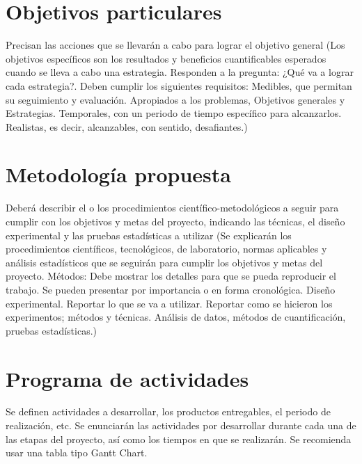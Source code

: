 \documentclass[letterpaper,12pt,oneside]{article}
\begin{document}
\section{Objetivos particulares}
Precisan las acciones que se llevarán a cabo para lograr el objetivo general (Los objetivos específicos son los resultados y beneficios cuantificables esperados cuando se lleva a cabo una estrategia. Responden a la pregunta: ¿Qué va a lograr cada estrategia?. Deben cumplir los siguientes requisitos: Medibles, que permitan su seguimiento y evaluación. Apropiados a los problemas, Objetivos generales y Estrategias. Temporales, con un periodo de tiempo específico para alcanzarlos. Realistas, es decir, alcanzables, con sentido, desafiantes.)

\section{Metodología propuesta}
Deberá describir el o los procedimientos científico-metodológicos a seguir para cumplir con los objetivos y metas del proyecto, indicando las técnicas, el diseño experimental y las pruebas estadísticas a utilizar (Se explicarán los procedimientos científicos, tecnológicos, de laboratorio, normas aplicables y análisis estadísticos que se seguirán para cumplir los objetivos y metas del proyecto. Métodos: Debe mostrar los detalles para que se pueda reproducir el trabajo. Se pueden presentar por importancia o en forma cronológica. Diseño experimental. Reportar lo que se va a utilizar. Reportar como se hicieron los experimentos; métodos y técnicas. Análisis  de datos, métodos de cuantificación, pruebas estadísticas.)

\section{Programa de actividades} 
Se definen actividades a desarrollar, los productos entregables, el periodo de realización, etc. Se enunciarán las actividades por desarrollar durante cada una de las etapas del proyecto, así como los tiempos en que se realizarán. Se recomienda usar una tabla tipo Gantt Chart.
\end{document}

